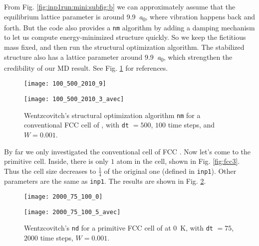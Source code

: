 From Fig. \ref{fig:inp1run:mini:subfig:b} we can approximately assume that the equilibrium
lattice parameter is around \SI{9.9}{\bohr}, where vibration happens back and forth.
But the code also provides a \texttt{nm} algorithm by adding a damping mechanism
to let us compute energy-minimized structure quickly. So we keep the fictitious mass fixed,
and then run the structural optimization algorithm. The stabilized structure also has a
lattice parameter around \SI{9.9}{\bohr}, which strengthen the credibility of our MD result.
See Fig. \ref{fig:inp5} for references.

\begin{figure}[H]
	\begin{minipage}[t]{0.48\textwidth}
		\centering
		\texttt{[image: 100\_500\_2010\_9]}
		\label{fig:inp5:mini:subfig:a}   %
	\end{minipage}
	\hfill
	\begin{minipage}[t]{0.48\textwidth}
		\centering
		\texttt{[image: 100\_500\_2010\_3\_avec]}
		\label{fig:inp5:mini:subfig:b}   %
	\end{minipage}
	\caption{Wentzcovitch's structural optimization algorithm \texttt{nm} for a conventional FCC cell of , with \texttt{dt} $=500$, $100$ time steps, and $W = 0.001$.}
	\label{fig:inp5}   %
\end{figure}

By far we only investigated the conventional cell of FCC .
Now let's come to the primitive cell. Inside,
there is only $1$  atom in the cell, shown in Fig. \ref{fig:fcc3}. Thus the cell size decreases to $\frac{ 1 }{ 4 }$ of the original one (defined in \texttt{inp1}).
Other parameters are the same as \texttt{inp1}.
The results are shown in Fig. \ref{fig:inp3run}.

\begin{figure}[H]
	\begin{minipage}[t]{0.48\textwidth}
		\centering
		\texttt{[image: 2000\_75\_100\_0]}
		\label{fig:inp3run:mini:subfig:a}   %
	\end{minipage}
	\hfill
	\begin{minipage}[t]{0.48\textwidth}
		\centering
		\texttt{[image: 2000\_75\_100\_5\_avec]}
		\label{fig:inp3run:mini:subfig:b}   %
	\end{minipage}
	\caption{Wentzcovitch's \texttt{nd} for a primitive FCC cell of  at \SI{0}{\kelvin}, with \texttt{dt} $=75$, $2000$ time steps, $W = 0.001$.}
	\label{fig:inp3run}   %
\end{figure}


